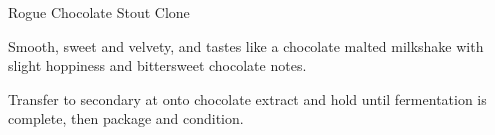 \begin{recipe}{Rogue Chocolate Stout Clone} %

\begin{aboutblock}
Smooth, sweet and velvety, and tastes like a chocolate malted milkshake with
slight hoppiness and bittersweet chocolate notes. 
\end{aboutblock}


\begin{methodandtiming}
 
\begin{mashsteps}
\end{mashsteps}

\begin{fermentationsteps}
\end{fermentationsteps}

\begin{directions}
Transfer to secondary at  onto chocolate extract and hold until
fermentation is complete, then package and condition.
\end{directions}

\end{methodandtiming}

\recipebreak

\begin{ingredientsblock}

\begin{malts}
\end{malts}

\begin{hops}
\end{hops}


\begin{twists}
\end{twists}

\end{ingredientsblock}

\end{recipe}

